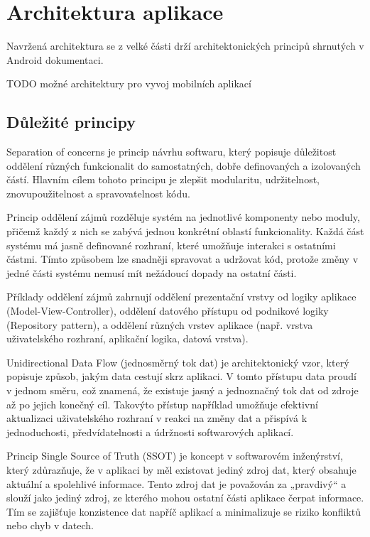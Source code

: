 \section{Architektura aplikace}
Navržená architektura se z velké části drží architektonických principů shrnutých v Android dokumentaci. \cite{andDocArch}

TODO možné architektury pro vyvoj mobilních aplikací

\subsection*{Důležité principy}

Separation of concerns je princip návrhu softwaru, který popisuje důležitost oddělení různých funkcionalit do samostatných, dobře definovaných a izolovaných částí.
Hlavním cílem tohoto principu je zlepšit modularitu, udržitelnost, znovupoužitelnost a spravovatelnost kódu.

Princip oddělení zájmů rozděluje systém na jednotlivé komponenty nebo moduly, přičemž každý z nich se zabývá jednou konkrétní 
oblastí funkcionality. Každá část systému má jasně definované rozhraní, které umožňuje interakci s ostatními částmi. 
Tímto způsobem lze snadněji spravovat a udržovat kód, protože změny v jedné části systému nemusí mít nežádoucí dopady na ostatní části.

Příklady oddělení zájmů zahrnují oddělení prezentační vrstvy od logiky aplikace (Model-View-Controller), oddělení datového přístupu od 
podnikové logiky (Repository pattern), a oddělení různých vrstev aplikace (např. vrstva uživatelského rozhraní, aplikační logika, datová vrstva). 

Unidirectional Data Flow (jednosměrný tok dat) je architektonický vzor, který popisuje způsob, jakým data cestují skrz aplikaci. 
V tomto přístupu data proudí v jednom směru, což znamená, že existuje jasný a jednoznačný tok dat od zdroje až po jejich konečný cíl.
Takovýto přístup například umožňuje efektivní aktualizaci uživatelského rozhraní v reakci na změny dat a přispívá k jednoduchosti, 
předvídatelnosti a údržnosti softwarových aplikací.

Princip Single Source of Truth (SSOT) je koncept v softwarovém inženýrství, který zdůrazňuje, že v aplikaci by měl existovat jediný 
zdroj dat, který obsahuje aktuální a spolehlivé informace. Tento zdroj dat je považován za „pravdivý“ a slouží jako jediný zdroj, 
ze kterého mohou ostatní části aplikace čerpat informace. Tím se zajišťuje konzistence dat napříč aplikací a minimalizuje se riziko 
konfliktů nebo chyb v datech.

